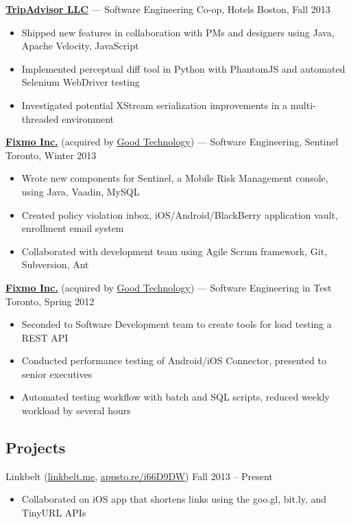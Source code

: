 \documentclass[pdftex,11pt,letterpaper]{article}
\begin{document}
\href{http://tripadvisor.com}{\textbf{TripAdvisor LLC}} --- Software Engineering Co-op, Hotels \hfill {\color{gray} Boston, Fall 2013}
\begin{itemize}
  \item Shipped new features in collaboration with PMs and designers using Java, Apache Velocity, JavaScript
  \item Implemented perceptual diff tool in Python with PhantomJS and automated Selenium WebDriver testing
  \item Investigated potential XStream serialization improvements in a multi-threaded environment
\end{itemize}

\href{http://fixmo.com}{\textbf{Fixmo Inc.}} (acquired by \href{http://good.com}{Good Technology}) --- Software Engineering, Sentinel \hfill {\color{gray} Toronto, Winter 2013}
\begin{itemize}
  \item Wrote new components for Sentinel, a Mobile Risk Management console, using Java, Vaadin, MySQL
  \item Created policy violation inbox, iOS/Android/BlackBerry application vault, enrollment email system
  \item Collaborated with development team using Agile Scrum framework, Git, Subversion, Ant
\end{itemize}

\href{http://fixmo.com}{\textbf{Fixmo Inc.}} (acquired by \href{http://good.com}{Good Technology}) --- Software Engineering in Test \hfill {\color{gray} Toronto, Spring 2012}
\begin{itemize}
  \item Seconded to Software Development team to create tools for load testing a REST API
  \item Conducted performance testing of Android/iOS Connector, presented to senior executives
  \item Automated testing workflow with batch and SQL scripts, reduced weekly workload by several hours
\end{itemize}

\subsection*{Projects}

Linkbelt (\href{http://linkbelt.me}{linkbelt.me}, \href{http://appsto.re/i66D9DW}{appsto.re/i66D9DW}) \hfill {\color{gray} Fall 2013 -- Present}
\begin{itemize}
  \item Collaborated on iOS app that shortens links using the goo.gl, bit.ly, and TinyURL APIs
\end{itemize}
\end{document}
